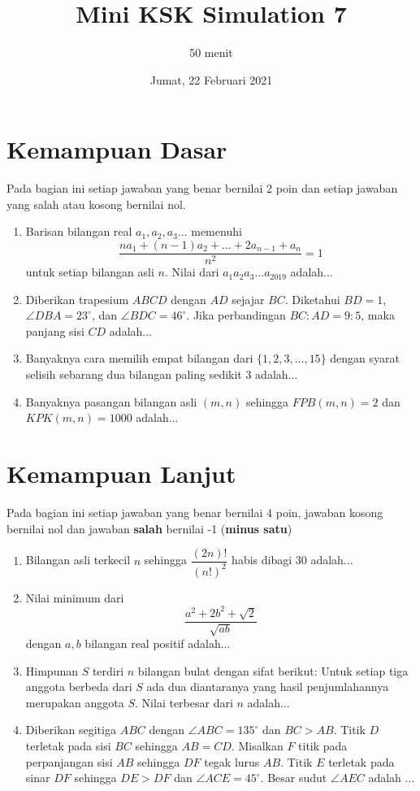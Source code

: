 \documentclass[12pt]{scrartcl}
\title{Mini KSK Simulation 7 }
\author{50 menit}
\date{Jumat, 22 Februari 2021}
\begin{document}
	\maketitle

\renewcommand*\contentsname{Daftar Isi}
\tableofcontents

\newpage
	
	\section{Kemampuan Dasar}
	Pada bagian ini setiap jawaban yang benar bernilai 2 poin dan setiap jawaban yang salah
	atau kosong bernilai nol.
	\begin{enumerate}
		
		\item
		Barisan bilangan real $a_1,a_2,a_3\dots$ memenuhi $$\frac{na_1+(n-1)a_2+\dots+2a_{n-1}+a_n}{n^2} = 1$$ untuk setiap bilangan asli $n$. Nilai dari $a_1a_2a_3\dots a_{2019}$ adalah...
		\item
		Diberikan trapesium $ABCD$ dengan $AD$ sejajar $BC$. Diketahui $BD=1$, $\angle DBA = 23^\circ$, dan $\angle BDC = 46^\circ$. Jika perbandingan $BC:AD=9:5$, maka panjang sisi $CD$ adalah...
		
		
		
		\item
		Banyaknya cara memilih empat bilangan dari $\{1,2,3,\dots,15\}$ dengan syarat selisih sebarang dua bilangan paling sedikit 3 adalah...
		
		\item
		Banyaknya pasangan bilangan asli $(m,n)$ sehingga $FPB(m,n)=2$ dan $KPK(m,n)=1000$ adalah...
	\end{enumerate}
\section{Kemampuan Lanjut}
Pada bagian ini setiap jawaban yang benar bernilai 4 poin, jawaban kosong bernilai nol
dan jawaban \textbf{salah} bernilai -1 (\textbf{minus satu})
\begin{enumerate}
		\item
		Bilangan asli terkecil $n$ sehingga $\dfrac{(2n)!}{(n!)^2}$ habis dibagi 30 adalah...
	


		
		\item
		Nilai minimum dari $$\frac{a^2+2b^2+\sqrt{2}}{\sqrt{ab}}$$ dengan $a,b$ bilangan real positif adalah...
		
		\item
		Himpunan $S$ terdiri $n$ bilangan bulat dengan sifat berikut: Untuk setiap tiga anggota berbeda dari $S$ ada dua diantaranya yang hasil penjumlahannya merupakan anggota $S$. Nilai terbesar dari $n$ adalah...
		
		\item
		Diberikan segitiga $ABC$ dengan $\angle ABC = 135^\circ$ dan $BC>AB$. Titik $D$ terletak pada sisi $BC$ sehingga $AB=CD$. Misalkan $F$ titik pada perpanjangan sisi $AB$ sehingga $DF$ tegak lurus $AB$. Titik $E$ terletak pada sinar $DF$ sehingga $DE>DF$ dan $\angle ACE = 45^\circ$. Besar sudut $\angle AEC $ adalah ...
		
	\end{enumerate}
		
\end{document}
